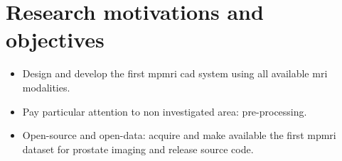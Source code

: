 \section{Research motivations and objectives}\label{sec:intro:motivation}

\begin{itemize}
\item Design and develop the first \ac{mpmri} \ac{cad} system using all available \ac{mri} modalities.
\item Pay particular attention to non investigated area: pre-processing.
\item Open-source and open-data: acquire and make available the first \ac{mpmri} dataset for prostate imaging and release source code.
\end{itemize}
